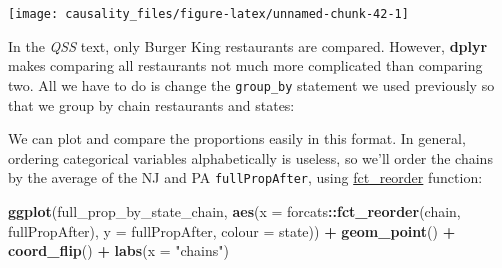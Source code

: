 \documentclass[]{book}
\newenvironment{Shaded}{\begin{snugshade}}{\end{snugshade}}
\newcommand{\KeywordTok}[1]{\textcolor[rgb]{0.13,0.29,0.53}{\textbf{#1}}}
\newcommand{\DataTypeTok}[1]{\textcolor[rgb]{0.13,0.29,0.53}{#1}}
\newcommand{\StringTok}[1]{\textcolor[rgb]{0.31,0.60,0.02}{#1}}
\newcommand{\CommentTok}[1]{\textcolor[rgb]{0.56,0.35,0.01}{\textit{#1}}}
\newcommand{\OperatorTok}[1]{\textcolor[rgb]{0.81,0.36,0.00}{\textbf{#1}}}
\newcommand{\NormalTok}[1]{#1}
\theoremstyle{definition}
\theoremstyle{definition}
\theoremstyle{definition}
\theoremstyle{remark}
\begin{document}
\begin{center}\texttt{[image: causality\_files/figure-latex/unnamed-chunk-42-1]} \end{center}

In the \emph{QSS} text, only Burger King restaurants are compared.
However, \textbf{dplyr} makes comparing all restaurants not much more
complicated than comparing two. All we have to do is change the
\texttt{group\_by} statement we used previously so that we group by
chain restaurants and states:

\begin{Shaded}
\end{Shaded}

We can plot and compare the proportions easily in this format. In
general, ordering categorical variables alphabetically is useless, so
we'll order the chains by the average of the NJ and PA
\texttt{fullPropAfter}, using
\href{https://www.rdocumentation.org/packages/forcats/topics/fct_reorder}{fct\_reorder}
function:

\begin{Shaded}
\begin{Highlighting}[]
\KeywordTok{ggplot}\NormalTok{(full_prop_by_state_chain,}
       \KeywordTok{aes}\NormalTok{(}\DataTypeTok{x =}\NormalTok{ forcats}\OperatorTok{::}\KeywordTok{fct_reorder}\NormalTok{(chain, fullPropAfter),}
           \DataTypeTok{y =}\NormalTok{ fullPropAfter,}
           \DataTypeTok{colour =}\NormalTok{ state)) }\OperatorTok{+}
\StringTok{  }\KeywordTok{geom_point}\NormalTok{() }\OperatorTok{+}
\StringTok{  }\KeywordTok{coord_flip}\NormalTok{() }\OperatorTok{+}
\StringTok{  }\KeywordTok{labs}\NormalTok{(}\DataTypeTok{x =} \StringTok{"chains"}\NormalTok{)}
\end{Highlighting}
\end{Shaded}
\end{document}
